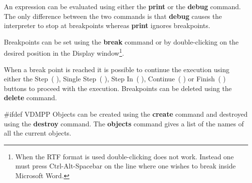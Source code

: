 \documentclass[\pformat,12pt]{article}
\newcommand{\guicmd}[1]{{\sf #1}}
\newcommand{\guicmd}[1]{{\gt #1}}
\begin{document}
An expression can be evaluated using either the
\textbf{print} or the
\textbf{debug} command.  The only difference
between the two commands 
is that {\bf debug} causes the interpreter to stop at breakpoints
whereas {\bf print} ignores breakpoints.

Breakpoints can be set using the \textbf{break} command
 or by 
double-clicking on the desired position in the \guicmd{Display}
window\footnote{When the RTF format is used double-clicking does not
work. Instead one must press Ctrl-Alt-Spacebar on the line where one
wishes to break inside Microsoft Word.}.

When a break point is reached
it is possible to continue the execution using either the
\guicmd{Step}~(\hspace{-1.8mm}
),
\guicmd{Single Step}~(\hspace{-1.8mm} 
),
\guicmd{Step In}~(\hspace{-1.8mm}
),
\guicmd{Continue}~(\hspace{-1.8mm}
)
or \guicmd{Finish}~(\hspace{-1.8mm} 
)
buttons to proceed with the execution. Breakpoints can be deleted
using the \textbf{delete} command. 

#ifdef VDMPP
Objects can be created using the \textbf{create} command
 and destroyed
using the \textbf{destroy} command. The
\textbf{objects} command gives 
a list of the names of all the current objects.
\end{document}
